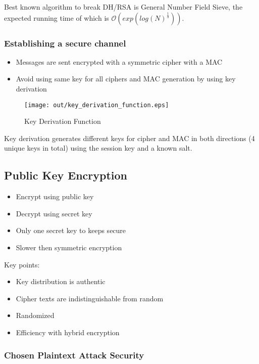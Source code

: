 \documentclass[a4paper]{article}
\begin{document}
Best known algorithm to break DH/RSA is General Number Field Sieve, the expected
running time of which is $\mathcal{O}(exp(log(N)^{\frac{1}{3}}))$.

\subsubsection{Establishing a secure channel}

\begin{itemize}
  \item Messages are sent encrypted with a symmetric cipher with a MAC
  \item Avoid using same key for all ciphers and MAC generation by using key
        derivation
\end{itemize}

\begin{figure}[h!]
  \centering
  \texttt{[image: out/key\_derivation\_function.eps]}
  \caption{Key Derivation Function}
  \label{fig:key_derivation_function}
\end{figure}
\FloatBarrier

Key derivation generates different keys for cipher and MAC in both directions (4
unique keys in total) using the session key and a known salt.

\subsection{Public Key Encryption}

\begin{itemize}
  \item Encrypt using public key
  \item Decrypt using secret key
  \item Only one secret key to keeps secure
  \item Slower then symmetric encryption
\end{itemize}

Key points:
\begin{itemize}
  \item Key distribution is authentic
  \item Cipher texts are indistinguishable from random
  \item Randomized
  \item Efficiency with hybrid encryption
\end{itemize}

\subsubsection{Chosen Plaintext Attack Security}
\end{document}

